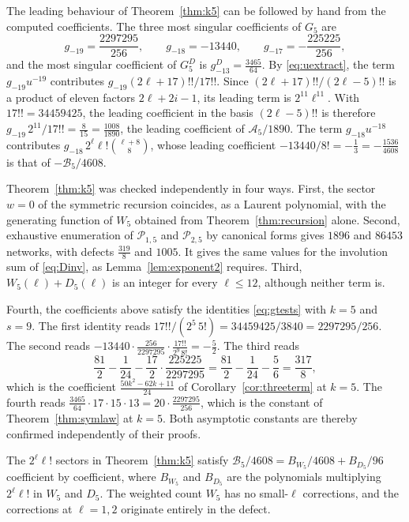 \documentclass[11pt,a4paper]{article}
\theoremstyle{definition}
\newcommand{\cP}{\mathcal{P}}
\begin{document}
The leading behaviour of Theorem~\ref{thm:k5} can be followed by hand from the computed coefficients. The three most singular coefficients of $G_5$ are
\[
g_{-19}=\frac{2297295}{256},\qquad g_{-18}=-13440,\qquad g_{-17}=-\frac{225225}{256},
\]
and the most singular coefficient of $G_5^D$ is $g^D_{-13}=\frac{3465}{64}$. By \eqref{eq:uextract}, the term $g_{-19}u^{-19}$ contributes $g_{-19}(2\ell+17)!!/17!!$. Since $(2\ell+17)!!/(2\ell-5)!!$ is a product of eleven factors $2\ell+2i-1$, its leading term is $2^{11}\ell^{11}$. With $17!!=34459425$, the leading coefficient in the basis $(2\ell-5)!!$ is therefore $g_{-19}\,2^{11}/17!!=\frac{8}{15}=\frac{1008}{1890}$, the leading coefficient of $\mathcal A_5/1890$. The term $g_{-18}u^{-18}$ contributes $g_{-18}\,2^\ell\ell!\binom{\ell+8}{8}$, whose leading coefficient $-13440/8!=-\frac13=-\frac{1536}{4608}$ is that of $-\mathcal B_5/4608$.

Theorem~\ref{thm:k5} was checked independently in four ways. First, the sector $w=0$ of the symmetric recursion coincides, as a Laurent polynomial, with the generating function of $W_5$ obtained from Theorem~\ref{thm:recursion} alone. Second, exhaustive enumeration of $\cP_{1,5}$ and $\cP_{2,5}$ by canonical forms gives $1896$ and $86453$ networks, with defects $\frac{319}{8}$ and $1005$. It gives the same values for the involution sum of \eqref{eq:Dinv}, as Lemma~\ref{lem:exponent2} requires. Third, $W_5(\ell)+D_5(\ell)$ is an integer for every $\ell\le12$, although neither term is.

Fourth, the coefficients above satisfy the identities \eqref{eq:gtests} with $k=5$ and $s=9$. The first identity reads $17!!/(2^5\,5!)=34459425/3840=2297295/256$. The second reads $-13440\cdot\frac{256}{2297295}\cdot\frac{17!!}{2^9\,8!}=-\frac52$. The third reads
\[
\frac{81}{2}-\frac{1}{24}-\frac{17}{2}\cdot\frac{225225}{2297295}=\frac{81}{2}-\frac{1}{24}-\frac56=\frac{317}{8},
\]
which is the coefficient $\frac{50k^2-62k+11}{24}$ of Corollary~\ref{cor:threeterm} at $k=5$. The fourth reads $\frac{3465}{64}\cdot17\cdot15\cdot13=20\cdot\frac{2297295}{256}$, which is the constant of Theorem~\ref{thm:symlaw} at $k=5$. Both asymptotic constants are thereby confirmed independently of their proofs.

The $2^\ell\ell!$ sectors in Theorem~\ref{thm:k5} satisfy $\mathcal B_5/4608=B_{W_5}/4608+B_{D_5}/96$ coefficient by coefficient, where $B_{W_5}$ and $B_{D_5}$ are the polynomials multiplying $2^\ell\ell!$ in $W_5$ and $D_5$. The weighted count $W_5$ has no small-$\ell$ corrections, and the corrections at $\ell=1,2$ originate entirely in the defect.
\end{document}
